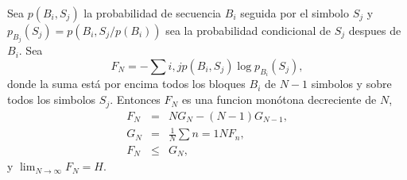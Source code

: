\begin{theorem}
Sea $p(B_{i},S_{j})$ la probabilidad de secuencia $B_{i}$ seguida por
el simbolo $S_{j}$ y $p_{B_{j}}(S_{j}) = p(B_{i},S_{j}/p(B_{i}))$ sea
la probabilidad condicional de $S_{j}$ despues de $B_{i}$. Sea
\begin{equation}
F_{N} = - \sum{i,j}{} p(B_{i},S_{j}) \log p_{B_{i}}(S_{j}),
\end{equation}
donde la suma est\'{a} por encima todos los bloques $B_{i}$ de $N-1$ simbolos y sobre
todos los simbolos $S_{j}$. Entonces $F_{N}$ es una funcion mon\'{o}tona decreciente de $N$,
\begin{equation}
\begin{array}{rcl}
F_{N} &=& NG_{N} - (N - 1)G_{N-1}, \\
G_{N} &=& \frac{1}{N} \sum{n=1}{N} F_{n}, \\
F_{N} &\leq& G_{N},
\end{array}
\end{equation}
y $\lim_{N \rightarrow \infty} F_{N} = H$.  
\end{theorem}

